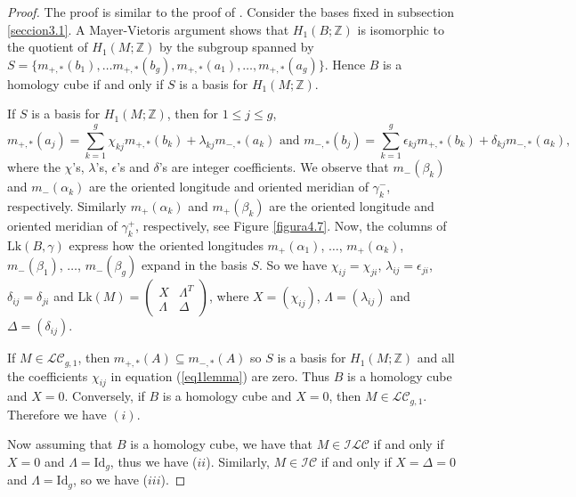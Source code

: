 \documentclass[10pt]{amsart}
\numberwithin{equation}{section}
\numberwithin{equation}{section}
\theoremstyle{definition}
\begin{document}
\begin{proof}

The proof is similar to the proof of \cite[Lemma 2.12]{MR2403806}. Consider the bases fixed  in subsection \ref{seccion3.1}. A Mayer-Vietoris  argument shows that $H_1(B;\mathbb{Z})$ is isomorphic to the quotient of $H_1(M;\mathbb{Z})$ by the subgroup spanned by $S=\{m_{+,*}(b_1),\ldots m_{+,*}(b_g), m_{+,*}(a_1),\ldots, m_{+,*}(a_g)\}$. Hence  $B$ is a homology cube if and only if $S$ is a basis for $H_1(M;\mathbb{Z})$.

If $S$ is a basis  for $H_1(M;\mathbb{Z})$, then for $1\leq j\leq g$,    
\begin{equation}\label{eq1lemma}
m_{+,*}(a_j)= \sum_{k=1}^{g}\chi_{kj} m_{+,*}(b_k)+ \lambda_{kj} m_{-,*}(a_k) \text{\ \ \ and \ \ \ } m_{-,*}(b_j)= \sum_{k=1}^{g}\epsilon_{kj} m_{+,*}(b_k) + \delta_{kj} m_{-,*}(a_k),
\end{equation}
where the $\chi$'s, $\lambda$'s, $\epsilon$'s and $\delta$'s are integer coefficients. We observe that $m_-(\beta_k)$ and $m_-(\alpha_k)$ are  the oriented longitude and oriented meridian of $\gamma_k^-$, respectively. Similarly  $m_+(\alpha_k)$ and $m_+(\beta_k)$ are the oriented longitude and oriented meridian of $\gamma_k^+$, respectively,  see Figure \ref{figura4.7}. Now, the columns of $\text{Lk}(B,\gamma)$ express how the oriented longitudes $m_+(\alpha_1)$, $\ldots$, $m_+(\alpha_k)$, $m_-(\beta_1)$, $\ldots$, $m_-(\beta_g)$ expand in the basis $S$. So we have $\chi_{ij}=\chi_{ji}$, $\lambda_{ij}=\epsilon_{ji}$, $\delta_{ij}=\delta_{ji}$ and  $\text{Lk}(M)=\left( \begin{smallmatrix} X & \Lambda^T\\ \Lambda & \Delta \end{smallmatrix} \right)$, where $X=(\chi_{ij})$, $\Lambda=(\lambda_{ij})$ and $\Delta=(\delta_{ij})$.

If $M\in\mathcal{LC}_{g,1}$, then $m_{+,*}(A)\subseteq m_{-,*}(A)$  so $S$ is a basis for $H_1(M;\mathbb{Z})$ and all the coefficients $\chi_{ij}$ in equation (\ref{eq1lemma}) are zero. Thus $B$ is a homology cube and $X=0$. Conversely, if $B$ is a homology cube and $X=0$, then $M\in\mathcal{LC}_{g,1}$. Therefore we have $(i)$.

Now assuming that $B$ is a homology cube, we have that  $M\in\mathcal{ILC}$ if and only if $X=0$ and $\Lambda=\text{Id}_g$, thus we have ($ii$). Similarly, $M\in\mathcal{IC}$ if and only if $X=\Delta=0$ and $\Lambda=\text{Id}_{g}$, so we have ($iii$).
\end{proof}	
\end{document}

